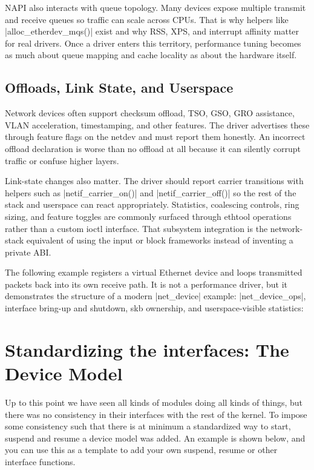 \documentclass[10pt, oneside]{book}
\begin{document}
NAPI also interacts with queue topology.
Many devices expose multiple transmit and receive queues so traffic can scale
across CPUs.
That is why helpers like \cpp|alloc_etherdev_mqs()| exist and why RSS, XPS, and
interrupt affinity matter for real drivers.
Once a driver enters this territory, performance tuning becomes as much about
queue mapping and cache locality as about the hardware itself.

\subsection{Offloads, Link State, and Userspace}
\label{sec:net_offloads}
Network devices often support checksum offload, TSO, GSO, GRO assistance, VLAN
acceleration, timestamping, and other features.
The driver advertises these through feature flags on the netdev and must report
them honestly.
An incorrect offload declaration is worse than no offload at all because it can
silently corrupt traffic or confuse higher layers.

Link-state changes also matter.
The driver should report carrier transitions with helpers such as
\cpp|netif_carrier_on()| and \cpp|netif_carrier_off()| so the rest of the stack
and userspace can react appropriately.
Statistics, coalescing controls, ring sizing, and feature toggles are commonly
surfaced through ethtool operations rather than a custom ioctl interface.
That subsystem integration is the network-stack equivalent of using the input or
block frameworks instead of inventing a private ABI.

The following example registers a virtual Ethernet device and loops transmitted
packets back into its own receive path.
It is not a performance driver, but it demonstrates the structure of a modern
\cpp|net_device| example: \cpp|net_device_ops|, interface bring-up and shutdown,
skb ownership, and userspace-visible statistics:


\section{Standardizing the interfaces: The Device Model}
\label{sec:device_model}
Up to this point we have seen all kinds of modules doing all kinds of things, but there was no consistency in their interfaces with the rest of the kernel.
To impose some consistency such that there is at minimum a standardized way to start, suspend and resume a device model was added.
An example is shown below, and you can use this as a template to add your own suspend, resume or other interface functions.
\end{document}
